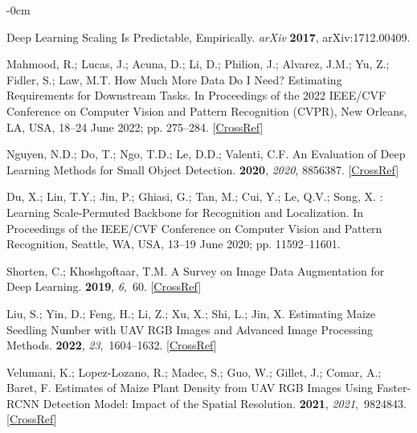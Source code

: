 \documentclass[12pt,a4paper,oneside]{report}
\newlength{\extralength}
\begin{document}
\begin{adjustwidth}{-\extralength}{0cm}
\begin{thebibliography}{999}
\newblock Deep {{Learning Scaling}} Is {{Predictable}}, {{Empirically}}. {\em arXiv} {\bf2017}, arXiv:1712.00409. 

Mahmood, R.; Lucas, J.; Acuna, D.; Li, D.; Philion, J.; Alvarez, J.M.; Yu, Z.;
Fidler, S.; Law, M.T.
\newblock How {{Much More Data Do I Need}}? {{Estimating Requirements}} for
{{Downstream Tasks}}.
\newblock In Proceedings of the 2022 {{IEEE}}/{{CVF Conference}} on {{Computer
Vision}} and {{Pattern Recognition}} ({{CVPR}}), New Orleans, LA, USA, 18--24 June 2022; pp. 275--284. [\href{http://dx.doi.org/10.1109/CVPR52688.2022.00037}{CrossRef}]

Nguyen, N.D.; Do, T.; Ngo, T.D.; Le, D.D.; Valenti, C.F.
\newblock An {{Evaluation}} of {{Deep Learning Methods}} for {{Small Object
Detection}}.
 {\bf 2020}, {\em 2020}, {8856387}. [\href{http://dx.doi.org/10.1155/2020/3189691}{CrossRef}]

Du, X.; Lin, T.Y.; Jin, P.; Ghiasi, G.; Tan, M.; Cui, Y.; Le, Q.V.; Song, X.
: {{Learning Scale-Permuted Backbone}} for
{{Recognition}} and {{Localization}}.
\newblock In Proceedings of the IEEE/CVF Conference on Computer Vision and Pattern Recognition, Seattle, WA, USA, 13--19 June 2020; pp. 11592--11601. 

Shorten, C.; Khoshgoftaar, T.M.
\newblock A Survey on {{Image Data Augmentation}} for {{Deep Learning}}.
 {\bf 2019}, {\em 6},~60. [\href{http://dx.doi.org/10.1186/s40537-019-0197-0}{CrossRef}]

Liu, S.; Yin, D.; Feng, H.; Li, Z.; Xu, X.; Shi, L.; Jin, X.
\newblock Estimating Maize Seedling Number with {{UAV RGB}} Images and Advanced
Image Processing Methods.
 {\bf 2022}, {\em 23},~1604--1632. [\href{http://dx.doi.org/10.1007/s11119-022-09899-y}{CrossRef}]

Velumani, K.; {Lopez-Lozano}, R.; Madec, S.; Guo, W.; Gillet, J.; Comar, A.;
Baret, F.
\newblock Estimates of {{Maize Plant Density}} from {{UAV RGB Images Using
Faster-RCNN Detection Model}}: {{Impact}} of the {{Spatial Resolution}}.
 {\bf 2021}, {\em 2021},~9824843. [\href{http://dx.doi.org/10.34133/2021/9824843}{CrossRef}]


\end{thebibliography}
\end{adjustwidth}
\end{document}
